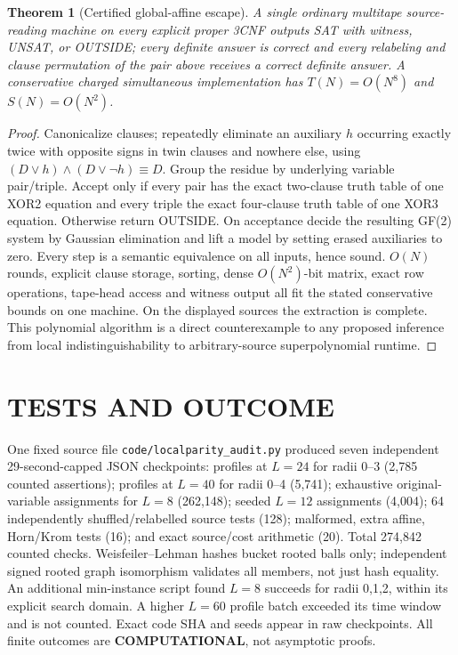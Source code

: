 \documentclass[11pt]{article}
\newtheorem{theorem}{Theorem}
\begin{document}
\begin{theorem}[Certified global-affine escape]
A single ordinary multitape source-reading machine on every explicit proper 3CNF outputs SAT with witness, UNSAT, or OUTSIDE; every definite answer is correct and every relabeling and clause permutation of the pair above receives a correct definite answer. A conservative charged simultaneous implementation has $T(N)=O(N^8)$ and $S(N)=O(N^2)$.
\end{theorem}
\begin{proof}
Canonicalize clauses; repeatedly eliminate an auxiliary $h$ occurring exactly twice with opposite signs in twin clauses and nowhere else, using $(D\vee h)\wedge(D\vee\neg h)\equiv D$. Group the residue by underlying variable pair/triple. Accept only if every pair has the exact two-clause truth table of one XOR2 equation and every triple the exact four-clause truth table of one XOR3 equation. Otherwise return OUTSIDE. On acceptance decide the resulting GF(2) system by Gaussian elimination and lift a model by setting erased auxiliaries to zero. Every step is a semantic equivalence on all inputs, hence sound. $O(N)$ rounds, explicit clause storage, sorting, dense $O(N^2)$-bit matrix, exact row operations, tape-head access and witness output all fit the stated conservative bounds on one machine. On the displayed sources the extraction is complete. This polynomial algorithm is a direct counterexample to any proposed inference from local indistinguishability to arbitrary-source superpolynomial runtime.
\end{proof}

\section{TESTS AND OUTCOME}
One fixed source file \texttt{code/localparity\_audit.py} produced seven independent 29-second-capped JSON checkpoints: profiles at $L=24$ for radii 0--3 (2,785 counted assertions); profiles at $L=40$ for radii 0--4 (5,741); exhaustive original-variable assignments for $L=8$ (262,148); seeded $L=12$ assignments (4,004); 64 independently shuffled/relabelled source tests (128); malformed, extra affine, Horn/Krom tests (16); and exact source/cost arithmetic (20). Total 274,842 counted checks. Weisfeiler--Lehman hashes bucket rooted balls only; independent signed rooted graph isomorphism validates all members, not just hash equality. An additional min-instance script found $L=8$ succeeds for radii 0,1,2, within its explicit search domain. A higher $L=60$ profile batch exceeded its time window and is not counted. Exact code SHA and seeds appear in raw checkpoints. All finite outcomes are \textbf{COMPUTATIONAL}, not asymptotic proofs.
\end{document}

